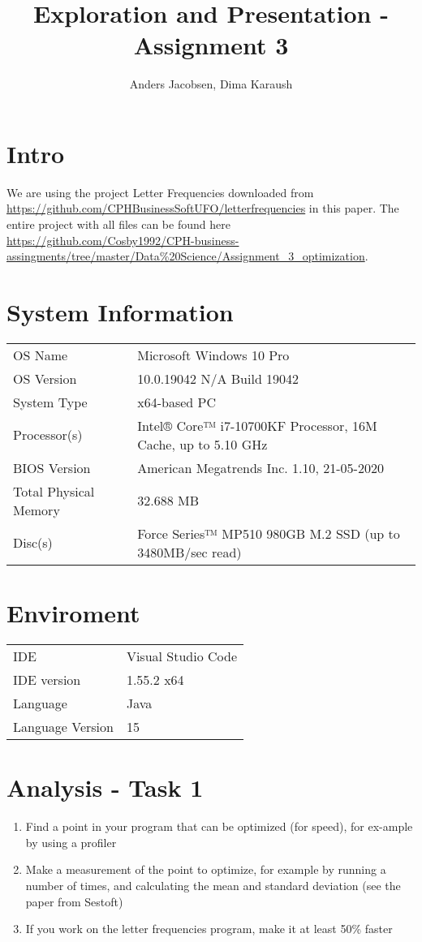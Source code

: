 \documentclass{article}
\author{Anders Jacobsen, Dima Karaush}
\title{Exploration and Presentation - Assignment 3}
\begin{document}
\maketitle

\newpage
\tableofcontents

\newpage
\section{Intro}
We are using the project Letter Frequencies downloaded 
from \url{https://github.com/CPHBusinessSoftUFO/letterfrequencies} 
in this paper. The entire project with all files can be found here 
\url{https://github.com/Cosby1992/CPH-business-assingments/tree/master/Data%20Science/Assignment_3_optimization}.

\section{System Information}
\begin{tabular}{ l l }
OS Name                 & Microsoft Windows 10 Pro \\ 
OS Version              & 10.0.19042 N/A Build 19042 \\  
System Type             & x64-based PC \\
Processor(s)            & Intel® Core™ i7-10700KF Processor, 16M Cache, up to 5.10 GHz \\
BIOS Version            & American Megatrends Inc. 1.10, 21-05-2020 \\
Total Physical Memory   & 32.688 MB \\ 
Disc(s)                 & Force Series™ MP510 980GB M.2 SSD (up to 3480MB/sec read)
\end{tabular}

\section{Enviroment}
\begin{tabular}{ l l }
IDE                     & Visual Studio Code \\ 
IDE version             & 1.55.2 x64 \\  
Language                & Java \\
Language Version        & 15 \\
\end{tabular}

\section{Analysis - Task 1}
\begin{enumerate}
    \item Find a point in your program that can be optimized (for speed), 
    for ex-ample by using a profiler
    \item Make a measurement of the point to optimize, for example by 
    running a number of times, and calculating the mean and standard 
    deviation (see the paper from Sestoft)
    \item If you work on the letter frequencies program, make it at least 50\% faster
\end{enumerate}
\end{document}
